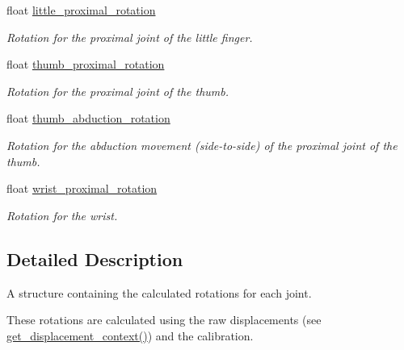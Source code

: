 \begin{DoxyCompactItemize}
float \hyperlink{struct_rotation_context_a869372b9af3b26e0239a12d4e6329ed3}{little\+\_\+proximal\+\_\+rotation}
\begin{DoxyCompactList}\small\item\em Rotation for the proximal joint of the little finger. \end{DoxyCompactList}\item 
\mbox{\label{struct_rotation_context_a821637ce6e1cf577c19e1553eaa011ef}} 
float \hyperlink{struct_rotation_context_a821637ce6e1cf577c19e1553eaa011ef}{thumb\+\_\+proximal\+\_\+rotation}
\begin{DoxyCompactList}\small\item\em Rotation for the proximal joint of the thumb. \end{DoxyCompactList}\item 
\mbox{\label{struct_rotation_context_a5a5776cc64bcafc497b7ad1d5bb1a087}} 
float \hyperlink{struct_rotation_context_a5a5776cc64bcafc497b7ad1d5bb1a087}{thumb\+\_\+abduction\+\_\+rotation}
\begin{DoxyCompactList}\small\item\em Rotation for the abduction movement (side-\/to-\/side) of the proximal joint of the thumb. \end{DoxyCompactList}\item 
\mbox{\label{struct_rotation_context_a3bd5cfd0ae94e5e84d5d3a2c5ebb6410}} 
float \hyperlink{struct_rotation_context_a3bd5cfd0ae94e5e84d5d3a2c5ebb6410}{wrist\+\_\+proximal\+\_\+rotation}
\begin{DoxyCompactList}\small\item\em Rotation for the wrist. \end{DoxyCompactList}\end{DoxyCompactItemize}


\subsection{Detailed Description}
A structure containing the calculated rotations for each joint. 

These rotations are calculated using the raw displacements (see {\ttfamily \hyperlink{group__displacement_access_ga26563f1c104bd9a0d80ab8c0afd1e8bd}{get\+\_\+displacement\+\_\+context()}}) and the calibration. 